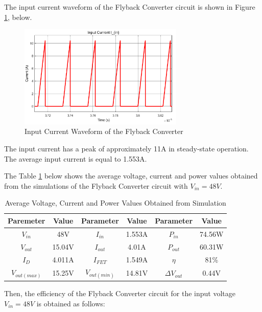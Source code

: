 The input current waveform of the Flyback Converter circuit is shown in Figure \ref{fig:Iin48}, below.

\begin{figure}[H]
\begin{center}
\includegraphics[width=0.7\textwidth]{figures/Iin_48.png}
\caption{Input Current Waveform of the Flyback Converter}
\label{fig:Iin48}
\end{center}
\end{figure}

The input current has a peak of approximately 11A in steady-state operation. The average input current is equal to 1.553A.

The Table \ref{tab:sim48} below shows the average voltage, current and power values obtained from the simulations of the Flyback Converter circuit with $V_{in} = 48V$. 

\begin{table}[H]
    \centering
    \caption{Average Voltage, Current and Power Values Obtained from Simulation}
    \begin{tabular}{|c|c|c|c|c|c|}
    \hline
\textbf{Paremeter}   & \textbf{Value}          & \textbf{Parameter}      & \textbf{Value}          & \textbf{Parameter} & \textbf{Value}         \\ \hline
$V_{in}$ & 48V & $I_{in}$ & 1.553A & $P_{in}$ & 74.56W \\ \hline
$V_{out}$ & 15.04V & $I_{out}$ & 4.01A & $P_{out}$ & 60.31W \\ \hline
$I_D$ & 4.011A & $I_{FET}$ & 1.549A & $\eta$ & 81\% \\ \hline
$V_{out(max)}$ & 15.25V & $V_{out(min)}$ & 14.81V & $\Delta V_{out}$ & 0.44V \\ \hline
    \end{tabular}
    \label{tab:sim48}
\end{table}

Then, the efficiency of the Flyback Converter circuit for the input voltage $V_{in} = 48V$ is obtained as follows:

